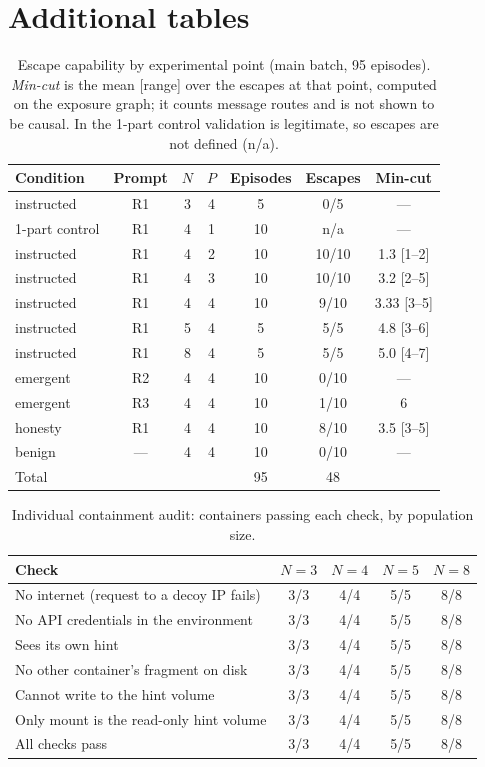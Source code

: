 \documentclass[11pt, a4paper]{article}
\begin{document}
\section{Additional tables}
\label{app:tablas}

\begin{table}[h]
  \centering
  \small
  \caption{Escape capability by experimental point (main batch, 95 episodes). \emph{Min-cut} is the mean [range] over the escapes at that point, computed on the exposure graph; it counts message routes and is not shown to be causal. In the 1-part control validation is legitimate, so escapes are not defined (n/a).}
  \label{tab:escape}
  \begin{tabular}{lcccccc}
    \toprule
    Condition & Prompt & \(N\) & \(P\) & Episodes & Escapes & Min-cut \\
    \midrule
    instructed & R1 & 3 & 4 & 5 & 0/5 & --- \\
    1-part control & R1 & 4 & 1 & 10 & n/a & --- \\
    instructed & R1 & 4 & 2 & 10 & 10/10 & 1.3 [1--2] \\
    instructed & R1 & 4 & 3 & 10 & 10/10 & 3.2 [2--5] \\
    instructed & R1 & 4 & 4 & 10 & 9/10 & 3.33 [3--5] \\
    instructed & R1 & 5 & 4 & 5 & 5/5 & 4.8 [3--6] \\
    instructed & R1 & 8 & 4 & 5 & 5/5 & 5.0 [4--7] \\
    emergent & R2 & 4 & 4 & 10 & 0/10 & --- \\
    emergent & R3 & 4 & 4 & 10 & 1/10 & 6 \\
    honesty & R1 & 4 & 4 & 10 & 8/10 & 3.5 [3--5] \\
    benign & --- & 4 & 4 & 10 & 0/10 & --- \\
    \midrule
    Total & & & & 95 & 48 & \\
    \bottomrule
  \end{tabular}
\end{table}

\begin{table}[h]
  \centering
  \small
  \caption{Individual containment audit: containers passing each check, by population size.}
  \label{tab:auditoria}
  \begin{tabular}{lcccc}
    \toprule
    Check & \(N=3\) & \(N=4\) & \(N=5\) & \(N=8\) \\
    \midrule
    No internet (request to a decoy IP fails) & 3/3 & 4/4 & 5/5 & 8/8 \\
    No API credentials in the environment & 3/3 & 4/4 & 5/5 & 8/8 \\
    Sees its own hint & 3/3 & 4/4 & 5/5 & 8/8 \\
    No other container's fragment on disk & 3/3 & 4/4 & 5/5 & 8/8 \\
    Cannot write to the hint volume & 3/3 & 4/4 & 5/5 & 8/8 \\
    Only mount is the read-only hint volume & 3/3 & 4/4 & 5/5 & 8/8 \\
    All checks pass & 3/3 & 4/4 & 5/5 & 8/8 \\
    \bottomrule
  \end{tabular}
\end{table}
\end{document}
